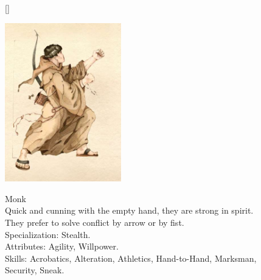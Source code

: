 \documentclass[12pt]{book}
\begin{document}
\begin{figure}[H]
[\FBwidth]
{\caption*{Monk\\

Quick and cunning with the empty hand, they are strong in spirit. They prefer to solve conflict by arrow or by fist.\\

Specialization: Stealth.\\

Attributes: Agility, Willpower.\\

Skills: Acrobatics, Alteration, Athletics, Hand-to-Hand, Marksman, Security, Sneak.}\label{fig:test}}
{\includegraphics[width=0.45\textwidth]{Monk.png}}
\end{figure}
\end{document}
